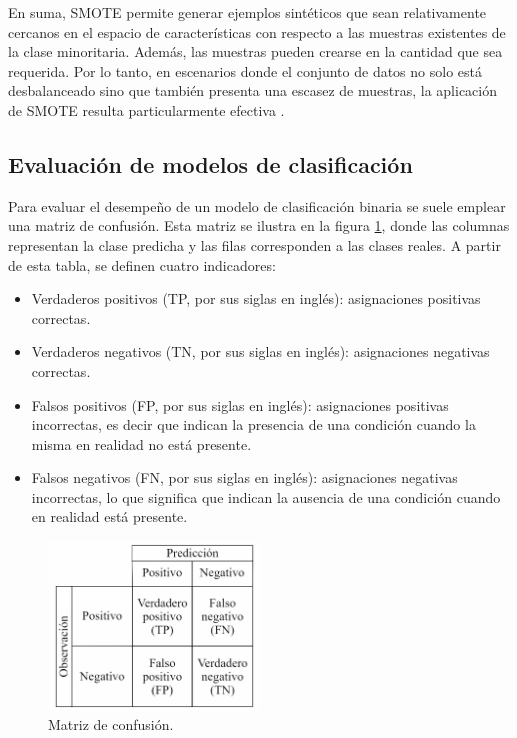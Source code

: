 
En suma, SMOTE permite generar ejemplos sintéticos que sean relativamente cercanos en el espacio de 
características con respecto a las muestras existentes de la clase minoritaria. Además, las muestras 
pueden crearse en la cantidad que sea requerida. Por lo tanto, en escenarios donde el conjunto de 
datos no solo está desbalanceado sino que también presenta una escasez de muestras, la aplicación 
de SMOTE resulta particularmente efectiva \citep{CITE:37} \citep{CITE:38}.

\subsection{Evaluación de modelos de clasificación}
Para evaluar el desempeño de un modelo de clasificación binaria se suele emplear una matriz de confusión. 
Esta matriz se ilustra en la figura \ref{fig:MatrizConfusion}, donde las columnas representan la clase 
predicha y las filas corresponden a las clases reales. 
A partir de esta tabla, se definen cuatro indicadores:

\begin{itemize}
	\item Verdaderos positivos (TP, por sus siglas en inglés): asignaciones positivas correctas.
	\item Verdaderos negativos (TN, por sus siglas en inglés): asignaciones negativas correctas.
\item Falsos positivos (FP, por sus siglas en inglés): asignaciones positivas incorrectas, es decir que
indican la presencia de una condición cuando la misma en realidad no está presente.
\item Falsos negativos (FN, por sus siglas en inglés): asignaciones negativas incorrectas, lo que significa
que indican la ausencia de una condición cuando en realidad está presente.
\end{itemize}

\begin{figure}[h!]
	\centering
	\includegraphics[width=0.5\textwidth]{./Figures/MatrizConfusion.jpg}
	\caption{Matriz de confusión.}\label{fig:MatrizConfusion}
\end{figure}

